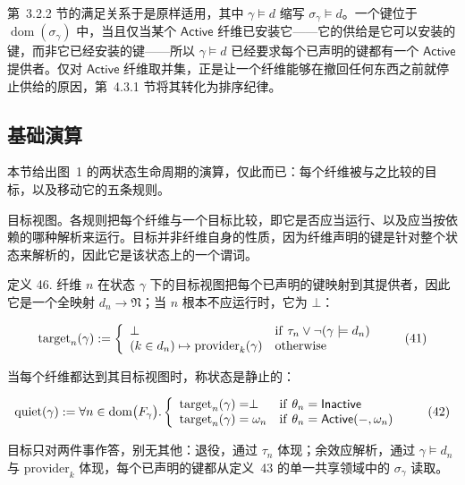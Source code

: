 \documentclass[
  10
]{article}
\begin{document}
第~3.2.2 节的满足关系于是原样适用，其中 \(\gamma \models d\) 缩写 \(\sigma _ { \gamma } \models d\)。一个键位于 \(\operatorname { d o m } \left( \sigma _ { \gamma } \right)\) 中，当且仅当某个 $\mathsf { A c t i v e }$ 纤维已安装它——它的供给是它可以安装的键，而非它已经安装的键——所以 \(\gamma \models d\) 已经要求每个已声明的键都有一个 $\mathsf { A c t i v e }$ 提供者。仅对 $\mathsf { A c t i v e }$ 纤维取并集，正是让一个纤维能够在撤回任何东西之前就停止供给的原因，第~4.3.1 节将其转化为排序纪律。

\subsection{基础演算} \label{the-base-calculus}

本节给出图~1 的两状态生命周期的演算，仅此而已：每个纤维被与之比较的目标，以及移动它的五条规则。

目标视图。各规则把每个纤维与一个目标比较，即它是否应当运行、以及应当按依赖的哪种解析来运行。目标并非纤维自身的性质，因为纤维声明的键是针对整个状态来解析的，因此它是该状态上的一个谓词。

定义 46. 纤维 $n$ 在状态 $\gamma$ 下的目标视图把每个已声明的键映射到其提供者，因此它是一个全映射 \(d _ { n } \to \mathfrak { N }\)；当 $n$ 根本不应运行时，它为 $\bot$：

\[
\mathrm { t a r g e t } _ { n } ( \gamma ) : = \left\{ \begin{array} { l l } { \hfill \perp } & { \mathrm { i f } \ \tau _ { n } \vee \neg ( \gamma \models d _ { n } ) } \\ { \hfill ( k \in d _ { n } ) \mapsto \mathrm { p r o v i d e r } _ { k } ( \gamma ) } & { \mathrm { o t h e r w i s e } } \end{array} \right.\tag{41}
\]

当每个纤维都达到其目标视图时，称状态是静止的：

\[
\operatorname { q u i e t } ( \gamma ) : = \forall n \in \operatorname { d o m } \bigl ( F _ { \gamma } \bigr ) . \left\{ \begin{array} { l l } { \operatorname { t a r g e t } _ { n } ( \gamma ) = \perp } & { \mathrm { i f ~ } \theta _ { n } = \mathsf { I n a c t i v e } } \\ { \operatorname { t a r g e t } _ { n } ( \gamma ) = \omega _ { n } } & { \mathrm { i f ~ } \theta _ { n } = \mathsf { A c t i v e } ( - , \omega _ { n } ) } \end{array} \right.\tag{42}
\]

目标只对两件事作答，别无其他：退役，通过 \(\tau _ { n }\) 体现；余效应解析，通过 \(\gamma \models d _ { n }\) 与 \(\mathrm { p r o v i d e r } _ { k }\) 体现，每个已声明的键都从定义~43 的单一共享领域中的 \(\sigma _ { \gamma }\) 读取。
\end{document}

